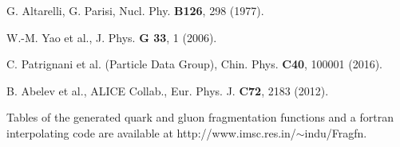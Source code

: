 \documentclass{ws-ijmpa}
\begin{document}
\begin{thebibliography}{99}
G. Altarelli, G. Parisi, Nucl. Phy. {\bf B126}, 298 (1977).

W.-M. Yao et al., J. Phys. {\bf G 33}, 1 (2006).

C. Patrignani et al. (Particle Data Group), Chin. Phys. {\bf C40}, 100001 (2016).

B. Abelev et al., ALICE Collab., Eur. Phys. J.  {\bf C72}, 2183 (2012).

Tables of the generated quark and gluon fragmentation
functions and a fortran interpolating code are available at
http://www.imsc.res.in/$\sim$indu/Fragfn.

\end{thebibliography}
\end{document}
